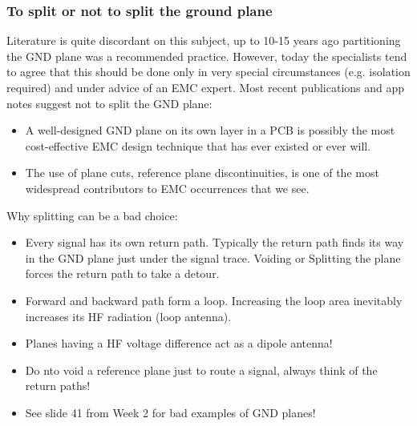 		\subsubsection{To split or not to split the ground plane}
		Literature is quite discordant on this subject, up to 10-15 years ago partitioning the GND plane was a recommended practice. However, today the specialists tend to agree that this should be done only in very special circumstances (e.g. isolation required) and under advice of an EMC expert. 		
		Most recent publications and app notes suggest not to split the GND plane:
		\begin{itemize}
			\item A well-designed GND plane on its own layer in a PCB is possibly the most cost-effective EMC design technique that has ever existed or ever will. 
			\item The use of plane cuts, reference plane discontinuities, is one of the most widespread contributors to EMC occurrences that we see. 
		\end{itemize}
		Why splitting can be a bad choice: 
		\begin{itemize}
			\item Every signal has its own return path. Typically the return path finds its way in the GND plane just under the signal trace. Voiding or Splitting the plane forces the return path to take a detour. 
			\item Forward and backward path form a loop. Increasing the loop area inevitably increases its HF radiation (loop antenna).
			\item Planes having a HF voltage difference act as a dipole antenna! 
			\item Do nto void a reference plane just to route a signal, always think of the return paths!
			\item See slide 41 from Week 2 for bad examples of GND planes!
		\end{itemize}

